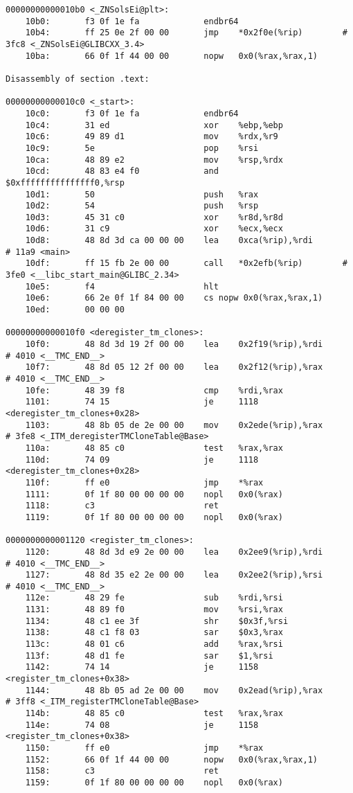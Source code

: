 \documentclass[UTF8,a4paper,10pt]{ctexart}
\begin{document}
\begin{lstlisting}[title=链接前后汇编代码对比,frame=trbl]
00000000000010b0 <_ZNSolsEi@plt>:
    10b0:       f3 0f 1e fa             endbr64
    10b4:       ff 25 0e 2f 00 00       jmp    *0x2f0e(%rip)        # 3fc8 <_ZNSolsEi@GLIBCXX_3.4>
    10ba:       66 0f 1f 44 00 00       nopw   0x0(%rax,%rax,1)

Disassembly of section .text:

00000000000010c0 <_start>:
    10c0:       f3 0f 1e fa             endbr64
    10c4:       31 ed                   xor    %ebp,%ebp
    10c6:       49 89 d1                mov    %rdx,%r9
    10c9:       5e                      pop    %rsi
    10ca:       48 89 e2                mov    %rsp,%rdx
    10cd:       48 83 e4 f0             and    $0xfffffffffffffff0,%rsp
    10d1:       50                      push   %rax
    10d2:       54                      push   %rsp
    10d3:       45 31 c0                xor    %r8d,%r8d
    10d6:       31 c9                   xor    %ecx,%ecx
    10d8:       48 8d 3d ca 00 00 00    lea    0xca(%rip),%rdi        # 11a9 <main>
    10df:       ff 15 fb 2e 00 00       call   *0x2efb(%rip)        # 3fe0 <__libc_start_main@GLIBC_2.34>
    10e5:       f4                      hlt
    10e6:       66 2e 0f 1f 84 00 00    cs nopw 0x0(%rax,%rax,1)
    10ed:       00 00 00 

00000000000010f0 <deregister_tm_clones>:
    10f0:       48 8d 3d 19 2f 00 00    lea    0x2f19(%rip),%rdi        # 4010 <__TMC_END__>
    10f7:       48 8d 05 12 2f 00 00    lea    0x2f12(%rip),%rax        # 4010 <__TMC_END__>
    10fe:       48 39 f8                cmp    %rdi,%rax
    1101:       74 15                   je     1118 <deregister_tm_clones+0x28>
    1103:       48 8b 05 de 2e 00 00    mov    0x2ede(%rip),%rax        # 3fe8 <_ITM_deregisterTMCloneTable@Base>
    110a:       48 85 c0                test   %rax,%rax
    110d:       74 09                   je     1118 <deregister_tm_clones+0x28>
    110f:       ff e0                   jmp    *%rax
    1111:       0f 1f 80 00 00 00 00    nopl   0x0(%rax)
    1118:       c3                      ret
    1119:       0f 1f 80 00 00 00 00    nopl   0x0(%rax)

0000000000001120 <register_tm_clones>:
    1120:       48 8d 3d e9 2e 00 00    lea    0x2ee9(%rip),%rdi        # 4010 <__TMC_END__>
    1127:       48 8d 35 e2 2e 00 00    lea    0x2ee2(%rip),%rsi        # 4010 <__TMC_END__>
    112e:       48 29 fe                sub    %rdi,%rsi
    1131:       48 89 f0                mov    %rsi,%rax
    1134:       48 c1 ee 3f             shr    $0x3f,%rsi
    1138:       48 c1 f8 03             sar    $0x3,%rax
    113c:       48 01 c6                add    %rax,%rsi
    113f:       48 d1 fe                sar    $1,%rsi
    1142:       74 14                   je     1158 <register_tm_clones+0x38>
    1144:       48 8b 05 ad 2e 00 00    mov    0x2ead(%rip),%rax        # 3ff8 <_ITM_registerTMCloneTable@Base>
    114b:       48 85 c0                test   %rax,%rax
    114e:       74 08                   je     1158 <register_tm_clones+0x38>
    1150:       ff e0                   jmp    *%rax
    1152:       66 0f 1f 44 00 00       nopw   0x0(%rax,%rax,1)
    1158:       c3                      ret
    1159:       0f 1f 80 00 00 00 00    nopl   0x0(%rax)


\end{lstlisting}
\end{document}

